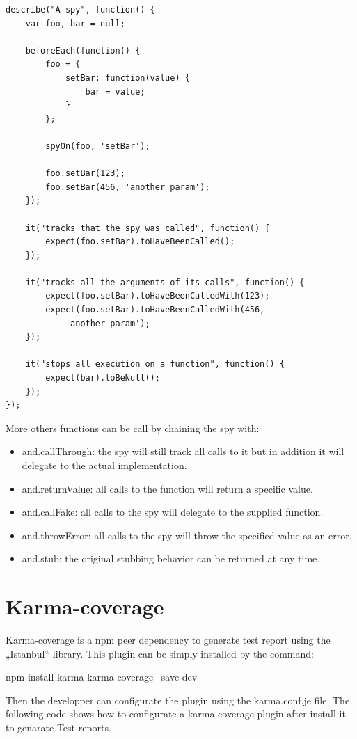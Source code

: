 \documentclass[11pt]{article}
\begin{document}
\begin{lstlisting}[caption=Spy usage]
describe("A spy", function() {
    var foo, bar = null;

    beforeEach(function() {
        foo = {
            setBar: function(value) {
                bar = value;
            }
        };

        spyOn(foo, 'setBar');

        foo.setBar(123);
        foo.setBar(456, 'another param');
    });

    it("tracks that the spy was called", function() {
        expect(foo.setBar).toHaveBeenCalled();
    });

    it("tracks all the arguments of its calls", function() {
        expect(foo.setBar).toHaveBeenCalledWith(123);
        expect(foo.setBar).toHaveBeenCalledWith(456,
            'another param');
    });

    it("stops all execution on a function", function() {
        expect(bar).toBeNull();
    });
});
\end{lstlisting}

More others functions can be call by chaining the spy with:

\begin{itemize}
\item and.callThrough: the spy will still track all calls to it but in addition it will delegate to the actual implementation.
\item and.returnValue: all calls to the function will return a specific value.
\item and.callFake: all calls to the spy will delegate to the supplied function.
\item and.throwError: all calls to the spy will throw the specified value as an error.
\item and.stub: the original stubbing behavior can be returned at any time.
\end{itemize}

\section{Karma-coverage}

Karma-coverage is a npm peer dependency to generate test report using the „Istanbul“ library. This plugin can be simply installed by the command:

\textdollar{} npm install karma karma-coverage --save-dev

Then the developper can configurate the plugin using the karma.conf.je file. The following code shows how to configurate a karma-coverage plugin after install it to genarate Test reports.
\end{document}
